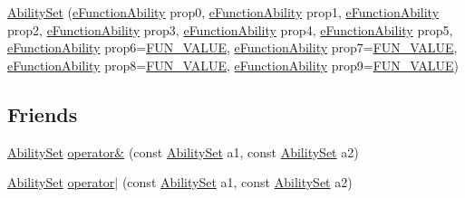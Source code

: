 \begin{DoxyCompactItemize}
\hyperlink{classocra_1_1AbilitySet_a1383bb4705a010d46ccab36107a20985}{Ability\+Set} (\hyperlink{namespaceocra_a40ddbec106a6034cd2047bba9945b568}{e\+Function\+Ability} prop0, \hyperlink{namespaceocra_a40ddbec106a6034cd2047bba9945b568}{e\+Function\+Ability} prop1, \hyperlink{namespaceocra_a40ddbec106a6034cd2047bba9945b568}{e\+Function\+Ability} prop2, \hyperlink{namespaceocra_a40ddbec106a6034cd2047bba9945b568}{e\+Function\+Ability} prop3, \hyperlink{namespaceocra_a40ddbec106a6034cd2047bba9945b568}{e\+Function\+Ability} prop4, \hyperlink{namespaceocra_a40ddbec106a6034cd2047bba9945b568}{e\+Function\+Ability} prop5, \hyperlink{namespaceocra_a40ddbec106a6034cd2047bba9945b568}{e\+Function\+Ability} prop6=\hyperlink{namespaceocra_a40ddbec106a6034cd2047bba9945b568acfb47b20329993093d2022b017239bd8}{F\+U\+N\+\_\+\+V\+A\+L\+UE}, \hyperlink{namespaceocra_a40ddbec106a6034cd2047bba9945b568}{e\+Function\+Ability} prop7=\hyperlink{namespaceocra_a40ddbec106a6034cd2047bba9945b568acfb47b20329993093d2022b017239bd8}{F\+U\+N\+\_\+\+V\+A\+L\+UE}, \hyperlink{namespaceocra_a40ddbec106a6034cd2047bba9945b568}{e\+Function\+Ability} prop8=\hyperlink{namespaceocra_a40ddbec106a6034cd2047bba9945b568acfb47b20329993093d2022b017239bd8}{F\+U\+N\+\_\+\+V\+A\+L\+UE}, \hyperlink{namespaceocra_a40ddbec106a6034cd2047bba9945b568}{e\+Function\+Ability} prop9=\hyperlink{namespaceocra_a40ddbec106a6034cd2047bba9945b568acfb47b20329993093d2022b017239bd8}{F\+U\+N\+\_\+\+V\+A\+L\+UE})
\end{DoxyCompactItemize}

\subsection*{Friends}
{\bf }\par
\begin{DoxyCompactItemize}
\item 
\hyperlink{classocra_1_1AbilitySet}{Ability\+Set} \hyperlink{classocra_1_1AbilitySet_ad326de0b1b729a34e494dfdea3ebe4b6}{operator\&} (const \hyperlink{classocra_1_1AbilitySet}{Ability\+Set} a1, const \hyperlink{classocra_1_1AbilitySet}{Ability\+Set} a2)
\item 
\hyperlink{classocra_1_1AbilitySet}{Ability\+Set} \hyperlink{classocra_1_1AbilitySet_a31839dcdc5a95a8f78f786f2488618a6}{operator$\vert$} (const \hyperlink{classocra_1_1AbilitySet}{Ability\+Set} a1, const \hyperlink{classocra_1_1AbilitySet}{Ability\+Set} a2)
\end{DoxyCompactItemize}



